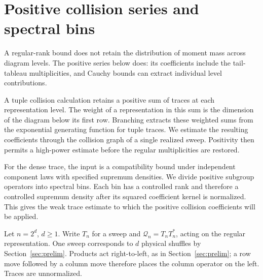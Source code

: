 \section{Positive collision series and spectral bins}\label{tra:collision-series}

A regular-rank bound does not retain the distribution of moment mass across diagram levels. The positive series below does: its coefficients include the tail-tableau multiplicities, and Cauchy bounds can extract individual level contributions.

A tuple collision calculation retains a positive sum of traces at each representation level. The weight of a representation in this sum is the dimension of the diagram below its first row. Branching extracts these weighted sums from the exponential generating function for tuple traces. We estimate the resulting coefficients through the collision graph of a single realized sweep. Positivity then permits a high-power estimate before the regular multiplicities are restored.

For the dense trace, the input is a compatibility bound under independent component laws with specified supremum densities. We divide positive subgroup operators into spectral bins. Each bin has a controlled rank and therefore a controlled supremum density after its squared coefficient kernel is normalized. This gives the weak trace estimate to which the positive collision coefficients will be applied.

Let $n=2^d$, $d\ge1$. Write $T_n$ for a sweep and $\mathcal Q_n=T_nT_n^*$, acting on the regular representation. One sweep corresponds to $d$ physical shuffles by Section~\ref{sec:prelim}. Products act right-to-left, as in Section~\ref{sec:prelim}; a row move followed by a column move therefore places the column operator on the left. Traces are unnormalized.

